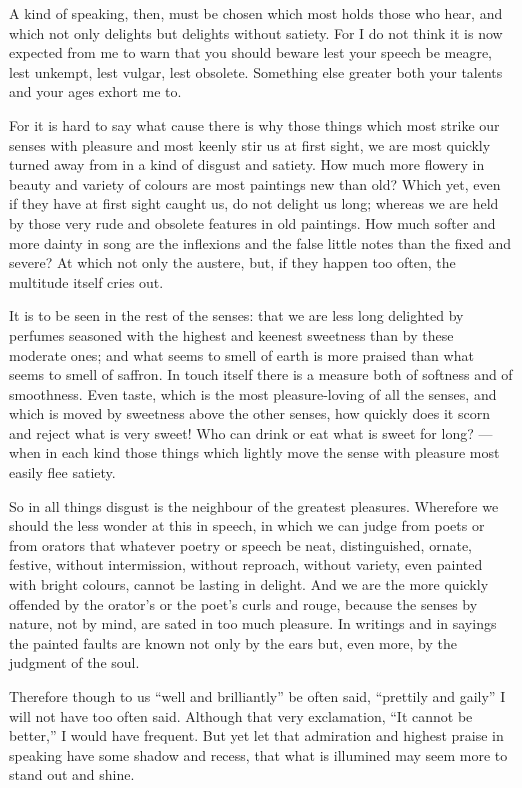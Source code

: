  A kind of speaking, then, must be chosen which most holds those who hear, and which not only delights but delights without satiety. For I do not think it is now expected from me to warn that you should beware lest your speech be meagre, lest unkempt, lest vulgar, lest obsolete. Something else greater both your talents and your ages exhort me to.

 For it is hard to say what cause there is why those things which most strike our senses with pleasure and most keenly stir us at first sight, we are most quickly turned away from in a kind of disgust and satiety. How much more flowery in beauty and variety of colours are most paintings new than old? Which yet, even if they have at first sight caught us, do not delight us long; whereas we are held by those very rude and obsolete features in old paintings. How much softer and more dainty in song are the inflexions and the false little notes than the fixed and severe? At which not only the austere, but, if they happen too often, the multitude itself cries out.

 It is to be seen in the rest of the senses: that we are less long delighted by perfumes seasoned with the highest and keenest sweetness than by these moderate ones; and what seems to smell of earth is more praised than what seems to smell of saffron. In touch itself there is a measure both of softness and of smoothness. Even taste, which is the most pleasure-loving of all the senses, and which is moved by sweetness above the other senses, how quickly does it scorn and reject what is very sweet! Who can drink or eat what is sweet for long? — when in each kind those things which lightly move the sense with pleasure most easily flee satiety.

 So in all things disgust is the neighbour of the greatest pleasures. Wherefore we should the less wonder at this in speech, in which we can judge from poets or from orators that whatever poetry or speech be neat, distinguished, ornate, festive, without intermission, without reproach, without variety, even painted with bright colours, cannot be lasting in delight. And we are the more quickly offended by the orator's or the poet's curls and rouge, because the senses by nature, not by mind, are sated in too much pleasure. In writings and in sayings the painted faults are known not only by the ears but, even more, by the judgment of the soul.

 Therefore though to us ``well and brilliantly'' be often said, ``prettily and gaily'' I will not have too often said. Although that very exclamation, ``It cannot be better,'' I would have frequent. But yet let that admiration and highest praise in speaking have some shadow and recess, that what is illumined may seem more to stand out and shine.

